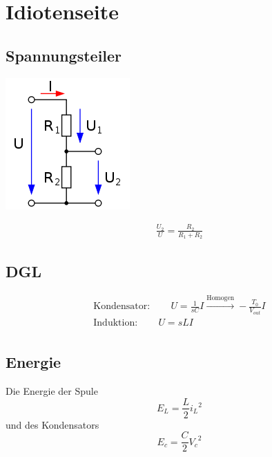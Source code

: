 \section{Idiotenseite}

\subsection{Spannungsteiler}
\begin{minipage}{0.20\textwidth}
	\includegraphics[width=\linewidth,keepaspectratio=true]{./Images/spannungsteiler}
\end{minipage}%
\begin{minipage}{0.30\textwidth}
	\begin{align*}
		\frac{U_2}{U} = \frac{R_2}{R_1 + R_2}
	\end{align*}
\end{minipage}

\subsection{DGL}
\begin{align*}
	\text{Kondensator}: \qquad U = \frac{1}{s C}I \xrightarrow{\text{Homogen}}  -\frac{T_0}{V_{out}}I\\
	\text{Induktion}: \qquad U = s L I \\
\end{align*}

\subsection{Energie}
Die Energie der Spule 
\[E_L = \frac{L}{2} {i_L}^2\]
und des Kondensators \[E_c = \frac{C}{2}{V_c}^2\]